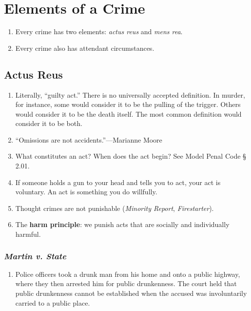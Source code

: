 \section{Elements of a Crime}

\begin{enumerate}
    \item Every crime has two elements: \emph{actus reus} and \emph{mens rea}.
    \item Every crime also has attendant circumstances.
\end{enumerate}

\subsection{Actus Reus}

\begin{enumerate}
    \item Literally, ``guilty act.'' There is no universally accepted definition. In murder, for instance, some would consider it to be the pulling of the trigger. Others would consider it to be the death itself. The most common definition would consider it to be both.
    \item ``Omissions are not accidents.''---Marianne Moore
    \item What constitutes an act? When does the act begin? See Model Penal Code § 2.01.
    \item If someone holds a gun to your head and tells you to act, your act is voluntary. An act is something you do willfully.
    \item Thought crimes are not punishable (\emph{Minority Report}, \emph{Firestarter}).
    \item The \textbf{harm principle}: we punish acts that are socially and individually harmful.
\end{enumerate}

\subsubsection{\emph{Martin v. State}}

\begin{enumerate}
    \item Police officers took a drunk man from his home and onto a public highway, where they then arrested him for public drunkenness. The court held that public drunkenness cannot be established when the accused was involuntarily carried to a public place.
\end{enumerate}

